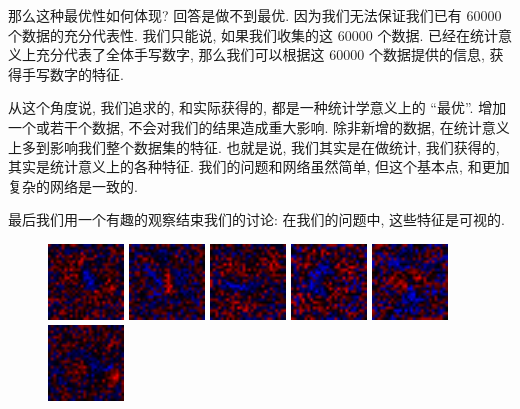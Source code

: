 \documentclass{ctexart}
\begin{document}
那么这种最优性如何体现? 回答是做不到最优. 因为我们无法保证我们已有 $60000$ 个数据的充分代表性.
我们只能说, 如果我们收集的这 $60000$ 个数据. 已经在统计意义上充分代表了全体手写数字, 
那么我们可以根据这 $60000$ 个数据提供的信息, 获得手写数字的特征. 

从这个角度说, 我们追求的, 和实际获得的, 都是一种统计学意义上的 ``最优''. 增加一个或若干个数据,
不会对我们的结果造成重大影响. 除非新增的数据, 在统计意义上多到影响我们整个数据集的特征. 也就是说,
我们其实是在做统计, 我们获得的, 其实是统计意义上的各种特征. 我们的问题和网络虽然简单, 但这个基本点,
和更加复杂的网络是一致的.

最后我们用一个有趣的观察结束我们的讨论: 在我们的问题中, 这些特征是可视的.

\begin{figure}
    \centering
    \includegraphics[width=0.18\textwidth]{images/weight-0.png}
    \includegraphics[width=0.18\textwidth]{images/weight-1.png}
    \includegraphics[width=0.18\textwidth]{images/weight-2.png}
    \includegraphics[width=0.18\textwidth]{images/weight-3.png}
    \includegraphics[width=0.18\textwidth]{images/weight-4.png}
    \includegraphics[width=0.18\textwidth]{images/weight-5.png}

\end{figure}
\end{document}
